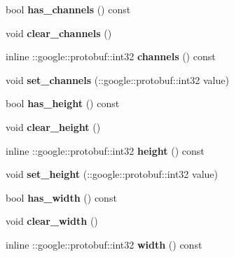 \begin{DoxyCompactItemize}
bool {\bfseries has\+\_\+channels} () const
\item 
\mbox{\label{classcaffe_1_1_datum_a4deee606d255027a97e69ebb3d9f23e6}} 
void {\bfseries clear\+\_\+channels} ()
\item 
\mbox{\label{classcaffe_1_1_datum_a90cef5b67b6a2cb40e1b851bcdb35584}} 
inline \+::google\+::protobuf\+::int32 {\bfseries channels} () const
\item 
\mbox{\label{classcaffe_1_1_datum_ac271ac8407a7eb4c4467076d7f0f9dfe}} 
void {\bfseries set\+\_\+channels} (\+::google\+::protobuf\+::int32 value)
\item 
\mbox{\label{classcaffe_1_1_datum_ac814e685e4ae7e3ecaa55007f1938f05}} 
bool {\bfseries has\+\_\+height} () const
\item 
\mbox{\label{classcaffe_1_1_datum_a548de766415fb3de8f13b87e94bdfa72}} 
void {\bfseries clear\+\_\+height} ()
\item 
\mbox{\label{classcaffe_1_1_datum_a70cd1cb9ed46144fbf72d7a45c1670f5}} 
inline \+::google\+::protobuf\+::int32 {\bfseries height} () const
\item 
\mbox{\label{classcaffe_1_1_datum_aaf43b7c6981b279c78b902b7fd8e5d99}} 
void {\bfseries set\+\_\+height} (\+::google\+::protobuf\+::int32 value)
\item 
\mbox{\label{classcaffe_1_1_datum_a1cca86df8eacefbbd9169bd3f44feabc}} 
bool {\bfseries has\+\_\+width} () const
\item 
\mbox{\label{classcaffe_1_1_datum_a3d1502f4be11c3083549ad46edca344d}} 
void {\bfseries clear\+\_\+width} ()
\item 
\mbox{\label{classcaffe_1_1_datum_ab63bcd476289395c6737b10d460d9747}} 
inline \+::google\+::protobuf\+::int32 {\bfseries width} () const
\item 
\mbox{\label{classcaffe_1_1_datum_af3e1c1e736e20b961e39f698f82ee840}} 

\end{DoxyCompactItemize}
